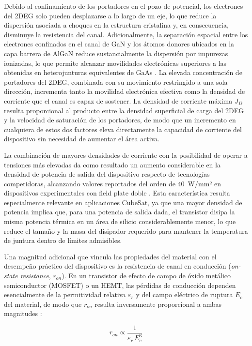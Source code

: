 Debido al confinamiento de los portadores en el pozo de potencial, los electrones del 2DEG solo pueden desplazarse a lo largo de un eje, lo que reduce la dispersión asociada a choques en la estructura cristalina y, en consecuencia, disminuye la resistencia del canal. Adicionalmente, la separación espacial entre los electrones confinados en el canal de GaN y los átomos donores ubicados en la capa barrera de AlGaN reduce sustancialmente la dispersión por impurezas ionizadas, lo que permite alcanzar movilidades electrónicas superiores a las obtenidas en heterojunturas equivalentes de GaAs \cite{mishra2008}. La elevada concentración de portadores del 2DEG, combinada con su movimiento restringido a una sola dirección, incrementa tanto la movilidad electrónica efectiva como la densidad de corriente que el canal es capaz de sostener. La densidad de corriente máxima $J_{D}$ resulta proporcional al producto entre la densidad superficial de carga del 2DEG y la velocidad de saturación de los portadores, de modo que un incremento en cualquiera de estos dos factores eleva directamente la capacidad de corriente del dispositivo sin necesidad de aumentar el área activa.

La combinación de mayores densidades de corriente con la posibilidad de operar a tensiones más elevadas da como resultado un aumento considerable en la densidad de potencia de salida del dispositivo respecto de tecnologías competidoras, alcanzando valores reportados del orden de 40~W/mm² en dispositivos experimentales con field plate doble \cite{wu2006}. Esta característica resulta especialmente relevante en aplicaciones CubeSat, ya que una mayor densidad de potencia implica que, para una potencia de salida dada, el transistor disipa la misma potencia térmica en un área de silicio considerablemente menor, lo que reduce el tamaño y la masa del disipador requerido para mantener la temperatura de juntura dentro de límites admisibles.

Una magnitud adicional que vincula las propiedades del material con el desempeño práctico del dispositivo es la resistencia de canal en conducción (\textit{on-state resistance}, $r_{on}$). En un transistor de efecto de campo de óxido metálico semiconductor (MOSFET) o un HEMT, las pérdidas de conducción dependen esencialmente de la permitividad relativa $\varepsilon_r$ y del campo eléctrico de ruptura $E_c$ del material, de modo que $r_{on}$ resulta inversamente proporcional a ambas magnitudes \cite{deblecker2015}:

\begin{equation}
    r_{on} \propto \frac{1}{\varepsilon_r \, E_c^3}
    \label{eq:ron}
\end{equation}

